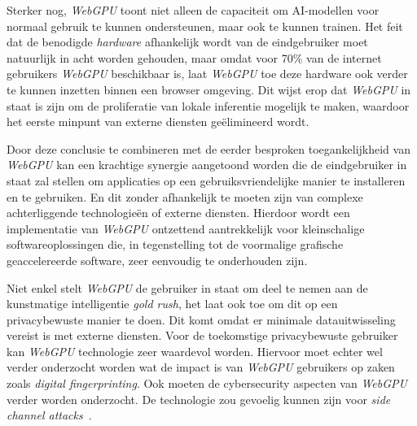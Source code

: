 \bigbreak{}

Sterker nog, \textit{WebGPU} toont niet alleen de capaciteit om  AI-modellen voor normaal gebruik te kunnen ondersteunen, maar ook te kunnen trainen. Het feit dat de benodigde \textit{hardware} afhankelijk wordt van de eindgebruiker moet natuurlijk in acht worden gehouden, maar omdat voor 70\% van de internet gebruikers \textit{WebGPU} beschikbaar is, laat \textit{WebGPU} toe deze hardware ook verder te kunnen inzetten binnen een browser omgeving. Dit wijst erop dat \textit{WebGPU} in staat is zijn om de proliferatie van lokale inferentie mogelijk te maken, waardoor het eerste minpunt van externe diensten geëlimineerd wordt.

\bigbreak{}

Door deze conclusie te combineren met de eerder besproken toegankelijkheid van \textit{WebGPU} kan een krachtige synergie aangetoond worden die de eindgebruiker in staat zal stellen om applicaties op een gebruiksvriendelijke manier te installeren en te gebruiken. En dit zonder afhankelijk te moeten zijn van complexe achterliggende technologieën of externe diensten. Hierdoor wordt een implementatie van \textit{WebGPU} ontzettend aantrekkelijk voor kleinschalige softwareoplossingen die, in tegenstelling tot de voormalige grafische geaccelereerde software, zeer eenvoudig te onderhouden zijn.


\bigbreak{}

Niet enkel stelt \textit{WebGPU} de gebruiker in staat om deel te nemen aan de kunstmatige intelligentie \textit{gold rush}, het laat ook toe om dit op een privacybewuste manier te doen. Dit komt omdat er minimale datauitwisseling vereist is met externe diensten. Voor de toekomstige privacybewuste gebruiker kan \textit{WebGPU} technologie zeer waardevol worden. Hiervoor moet echter wel verder onderzocht worden wat de impact is van \textit{WebGPU} gebruikers op zaken zoals \textit{digital fingerprinting}. Ook moeten de cybersecurity aspecten van \textit{WebGPU} verder worden onderzocht. De technologie zou gevoelig kunnen zijn voor \textit{side channel attacks}~\autocite{Giner2024}.

\bigbreak{}
\iffalse
TODO Beschrijf dat er verder moet onderzocht worden welke apparaten in staat zijn welke modellen te kunnen ondersteunen, dat hier verder onderzoek naar moet worden uitgevoerd, en dat dit merkbaar was bij het uitvoeren van chatgpu.

- Ik heb gelezen dat \textit{WebGPU} beschikbaar is voor desktops/laptops, maar ook in mobiele browsers. In hoeverre zijn de GPU's van al deze toestellen sterk genoeg? Is dit een aspect waar rekening moet mee gehouden worden bij het beschikbaar stellen van software die \textit{WebGPU} gebruikt 
\fi

